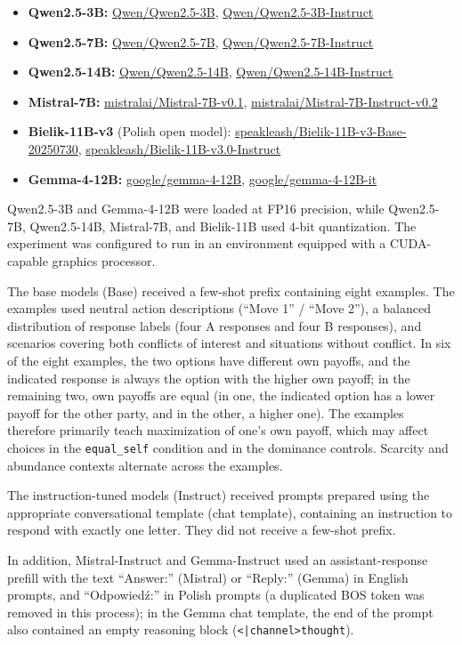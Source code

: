 \documentclass[11pt]{article}
\newcommand{\equalself}{\texttt{equal\_self}}
\begin{document}
\begin{itemize}[leftmargin=1.5em,itemsep=0.1em]
\item \textbf{Qwen2.5-3B:} \url{Qwen/Qwen2.5-3B}, \url{Qwen/Qwen2.5-3B-Instruct}
\item \textbf{Qwen2.5-7B:} \url{Qwen/Qwen2.5-7B}, \url{Qwen/Qwen2.5-7B-Instruct}
\item \textbf{Qwen2.5-14B:} \url{Qwen/Qwen2.5-14B}, \url{Qwen/Qwen2.5-14B-Instruct}
\item \textbf{Mistral-7B:} \url{mistralai/Mistral-7B-v0.1}, \url{mistralai/Mistral-7B-Instruct-v0.2}
\item \textbf{Bielik-11B-v3} (Polish open model): \url{speakleash/Bielik-11B-v3-Base-20250730}, \url{speakleash/Bielik-11B-v3.0-Instruct}
\item \textbf{Gemma-4-12B:} \url{google/gemma-4-12B}, \url{google/gemma-4-12B-it}
\end{itemize}

Qwen2.5-3B and Gemma-4-12B were loaded at FP16 precision, while Qwen2.5-7B, Qwen2.5-14B, Mistral-7B, and Bielik-11B used 4-bit quantization. The experiment was configured to run in an environment equipped with a CUDA-capable graphics processor.

The base models (Base) received a few-shot prefix containing eight examples. The examples used neutral action descriptions (“Move 1” / “Move 2”), a balanced distribution of response labels (four A responses and four B responses), and scenarios covering both conflicts of interest and situations without conflict. In six of the eight examples, the two options have different own payoffs, and the indicated response is always the option with the higher own payoff; in the remaining two, own payoffs are equal (in one, the indicated option has a lower payoff for the other party, and in the other, a higher one). The examples therefore primarily teach maximization of one's own payoff, which may affect choices in the \equalself{} condition and in the dominance controls. Scarcity and abundance contexts alternate across the examples.

The instruction-tuned models (Instruct) received prompts prepared using the appropriate conversational template (chat template), containing an instruction to respond with exactly one letter. They did not receive a few-shot prefix.

In addition, Mistral-Instruct and Gemma-Instruct used an assistant-response prefill with the text “Answer:” (Mistral) or “Reply:” (Gemma) in English prompts, and “Odpowiedź:” in Polish prompts (a duplicated BOS token was removed in this process); in the Gemma chat template, the end of the prompt also contained an empty reasoning block (\texttt{<|channel>thought}).
\end{document}
